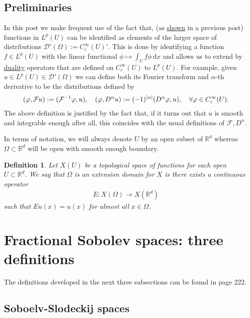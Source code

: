 \documentclass[
    a4paper,
    DIV=14,
    abstract=true,
    numbers=noenddot
]
{scrartcl}
\newtheorem{definition}[theorem]{Definition}
\theoremstyle{definition}
\renewcommand{\d}{\,\mathrm{d}}\newcommand{\dx}{\,\mathrm{d}x}
\newcommand{\R}{\mathbb{R}}
\newcommand{\Dd}{\mathcal{D}}
\newcommand{\Ff}{\mathcal{F}}
\begin{document}
\subsection{Preliminaries}
In this post we make frequent use of the fact that, (as \href{https://nowheredifferentiable.com/2023-07-12-PDEs-3-Sobolev_spaces/#:~:text=we%20would%20like%20to%20see%20what%20some%20of%20them%20look%20like.}{shown} in a previous post) functions in $L^p(U)$ can be identified as elements of the larger space of distributions $\Dd '(\Omega ):= C_c^\infty(U)'$. This is done by identifying a function $f \in L^p(U)$ with the linear functional $\phi \mapsto \int_U f\phi \d x$ and allows us to extend by \href{https://nowheredifferentiable.com/2023-01-29-PDE-1-Fourier/#:~:text=is%20called%20the-,duality,-method%20and%20appears}{duality} operators that are defined on $C_c^\infty(U)$ to $L^p(U)$. For example, given $u \in L^p(U) \in \Dd'(\Omega )$ we can define both its Fourier transform and  $\alpha$-th derivative to be the distributions defined by
\begin{align*}
    (\varphi ,\Ff u):=(\Ff^{-1}\varphi ,u),\quad (\varphi ,D^\alpha u):=(-1)^{\abs{\alpha}}(D^\alpha \varphi ,u), \quad \forall \varphi \in C_c^\infty(U).
\end{align*}
The above definition is justified by the fact that, if it turns out that $u$ is smooth and integrable enough after all, this coincides with the usual definitions of $\Ff , D^\alpha$.

In terms of notation, we will always denote $U$ by an open subset of $\R^d$  whereas $\Omega \subset \R^d $ will be open with smooth enough boundary.
\begin{definition}
    Let $X(U)$ be a topological space of functions for each open $U \subset \R^d$.
    We say that $\Omega $ is an extension domain for $X$  is there exists a continuous operator
    \begin{align*}
        E: X(\Omega ) \to X(\R^d)
    \end{align*}
    such that  $Eu(x)=u(x)$  for almost all $x \in \Omega $.
\end{definition}



\section{Fractional Sobolev spaces: three definitions}
The definitions developed in the next three subsections can be found in \cite{agranovich2015sobolev} page 222.
\subsection{Soboelv-Slodeckij spaces}
\end{document}
